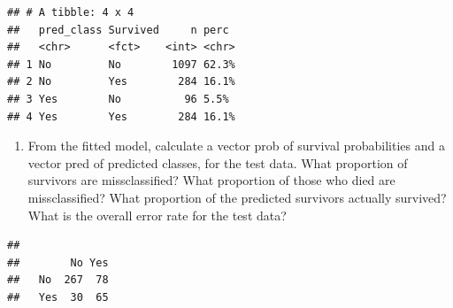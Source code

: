 \documentclass[]{article}
\newenvironment{Shaded}{\begin{snugshade}}{\end{snugshade}}
\newcommand{\CommentTok}[1]{\textcolor[rgb]{0.56,0.35,0.01}{\textit{#1}}}
\newcommand{\DataTypeTok}[1]{\textcolor[rgb]{0.13,0.29,0.53}{#1}}
\newcommand{\FloatTok}[1]{\textcolor[rgb]{0.00,0.00,0.81}{#1}}
\newcommand{\KeywordTok}[1]{\textcolor[rgb]{0.13,0.29,0.53}{\textbf{#1}}}
\newcommand{\NormalTok}[1]{#1}
\newcommand{\OperatorTok}[1]{\textcolor[rgb]{0.81,0.36,0.00}{\textbf{#1}}}
\newcommand{\StringTok}[1]{\textcolor[rgb]{0.31,0.60,0.02}{#1}}
\providecommand{\tightlist}{%
  \setlength{\itemsep}{0pt}\setlength{\parskip}{0pt}}
\begin{document}
\begin{verbatim}
## # A tibble: 4 x 4
##   pred_class Survived     n perc 
##   <chr>      <fct>    <int> <chr>
## 1 No         No        1097 62.3%
## 2 No         Yes        284 16.1%
## 3 Yes        No          96 5.5% 
## 4 Yes        Yes        284 16.1%
\end{verbatim}

\begin{Shaded}
\end{Shaded}

\begin{enumerate}
\def\labelenumi{(\alph{enumi})}
\setcounter{enumi}{2}
\tightlist
\item
  From the fitted model, calculate a vector prob of survival
  probabilities and a vector pred of predicted classes, for the test
  data. What proportion of survivors are missclassified? What proportion
  of those who died are missclassified? What proportion of the predicted
  survivors actually survived? What is the overall error rate for the
  test data?
\end{enumerate}

\begin{Shaded}
\end{Shaded}

\begin{verbatim}
##      
##        No Yes
##   No  267  78
##   Yes  30  65
\end{verbatim}

\begin{Shaded}
\end{Shaded}
\end{document}
